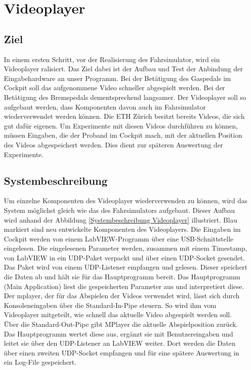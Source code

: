 \section{Videoplayer}
\subsection{Ziel}
In einem ersten Schritt, vor der Realisierung des Fahrsimulator, wird ein Videoplayer ralisiert. Das Ziel dabei ist der Aufbau und Test der Anbindung der Eingabehardware an unser Programm. Bei der Betätigung des Gaspedals im Cockpit soll das aufgenommene Video schneller abgespielt werden. Bei der Betätigung des Bremspedals dementsprechend langsamer. Der Videoplayer soll so aufgebaut werden, dass Komponenten davon auch im Fahrsimulator wiederverwendet werden können. Die ETH Zürich besitzt bereits Videos, die sich gut dafür eigenen. Um Experimente mit diesen Videos durchführen zu können, müssen Eingaben, die der Proband im Cockpit mach, mit der aktuellen Position des Videos abgespeichert werden. Dies dient zur späteren Auswertung der Experimente.
\\
\subsection{Systembeschreibung}

Um einzelne Komponenten des Videoplayer wiederverwenden zu können, wird das System möglichst gleich wie das des Fahrsimulators aufgebaut. Dieser Aufbau wird anhand der Abbildung \ref{Systembeschreibung Videoplayer} illustriert. Blau markiert sind neu entwickelte Komponenten des Videoplayers. Die Eingaben im Cockpit werden von einem LabVIEW-Programm über eine USB-Schnittstelle eingelesen. Die eingelesenen Parameter werden, zusammen mit einem Timestamp, von LabVIEW in ein UDP-Paket verpackt und über einen UDP-Socket gesendet. Das Paket wird von einem UDP-Listener empfangen und gelesen. Dieser speichert die Daten ab und hält sie für das Hauptprogramm bereit. Das Hauptprogramm (Main Application) liest die gespeicherten Parameter aus und interpretiert diese. Der \gls{mplayer}, der für das Abspielen der Videos verwendet wird, lässt sich durch Konsoleneingaben über die Standard-In-Pipe steuern. So wird ihm vom Videoplayer mitgeteilt, wie schnell das aktuelle Video abgespielt werden soll.  Über die Standard-Out-Pipe gibt MPlayer die aktuelle Abspielposition zurück. Das Hauptprogramm wertet diese aus, ergänzt sie mit Benutzereingaben und leitet sie über den UDP-Listener an LabVIEW weiter. Dort werden die Daten über  einen zweiten UDP-Socket empfangen und für eine spätere Auswertung in ein Log-File gespeichert.
\newpage


